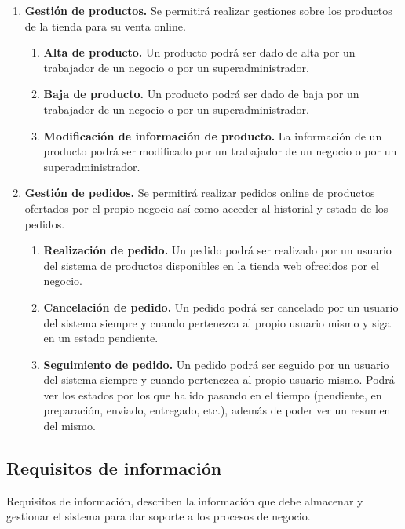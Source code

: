 \begin{enumerate}[leftmargin=1.75cm,start=1,label={\bfseries RF-\arabic*.}]
    \item \textbf{Gestión de productos.} Se permitirá realizar gestiones sobre los productos de la tienda para su venta online.
    \begin{enumerate}[start=1,label={\bfseries RF-5.\arabic*.}]
        \item \textbf{Alta de producto.} Un producto podrá ser dado de alta por un trabajador de un negocio o por un superadministrador.
        \item \textbf{Baja de producto.} Un producto podrá ser dado de baja por un trabajador de un negocio o por un superadministrador.
        \item \textbf{Modificación de información de producto.} La información de un producto podrá ser modificado por un trabajador de un negocio o por un superadministrador.
    \end{enumerate}
    
    \item \textbf{Gestión de pedidos.} Se permitirá realizar pedidos online de productos ofertados por el propio negocio así como acceder al historial y estado de los pedidos.
    \begin{enumerate}[start=1,label={\bfseries RF-6.\arabic*.}]
        \item \textbf{Realización de pedido.} Un pedido podrá ser realizado por un usuario del sistema de productos disponibles en la tienda web ofrecidos por el negocio.
        \item \textbf{Cancelación de pedido.} Un pedido podrá ser cancelado por un usuario del sistema siempre y cuando pertenezca al propio usuario mismo y siga en un estado pendiente.
        \item \textbf{Seguimiento de pedido.} Un pedido podrá ser seguido por un usuario del sistema siempre y cuando pertenezca al propio usuario mismo. Podrá ver los estados por los que ha ido pasando en el tiempo (pendiente, en preparación, enviado, entregado, etc.), además de poder ver un resumen del mismo.
    \end{enumerate}
\end{enumerate}

\subsection{Requisitos de información}

Requisitos de información, describen la información que debe almacenar y gestionar el sistema para dar soporte a los
procesos de negocio.

